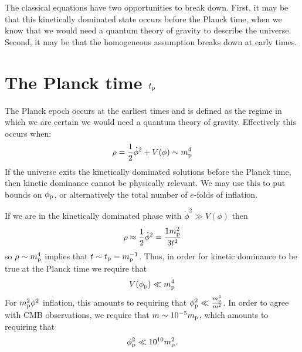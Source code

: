 The classical equations have two opportunities to break down. First, it may be that this kinetically dominated state occurs before the Planck time, when we know that we would need a quantum theory of gravity to describe the universe. Second, it may be that the homogeneous assumption breaks down at early times.

\section{The Planck time $t_{\mathrm{p}}$}
The Planck epoch occurs at the earliest times and is defined as the
regime in which we are certain we would need a quantum theory of
gravity. Effectively this occurs when:
\begin{equation}
  \rho = \frac{1}{2}\dot\phi^2 + V(\phi)  \sim m_{\mathrm{p}}^4
  \label{eqn:rhosim}
\end{equation}
If the universe exits the kinetically dominated solutions before the
Planck time, then kinetic dominance cannot be physically relevant. We
may use this to put bounds on $\phi_{\mathrm{p}}$, or alternatively the total
number of $e$-folds of inflation.

If we are in the kinetically dominated phase with $\dot{\phi}^2\gg
V(\phi)$ then
\begin{equation}
              \rho \approx \frac{1}{2}\dot\phi^2= \frac{1m_{\mathrm{p}}^2}{3t^2} 
  \label{eqn:rhop}
\end{equation}
so $\rho\sim m_{\mathrm{p}}^4$ implies that $t\sim t_{\mathrm{p}}=m_{\mathrm{p}}^{-1}$. Thus, in order for
kinetic dominance to be true at the Planck time we require that
\begin{equation}
  V(\phi_{\mathrm{p}}) \ll m_{\mathrm{p}}^4
\end{equation}
For $m_{\mathrm{p}}^2\phi^2$ inflation, this amounts to requiring that $\phi_{\mathrm{p}}^2\ll
\frac{m_{\mathrm{p}}^4}{m^2}$. In order to agree with CMB observations, we require
that $m\sim10^{-5}m_{\mathrm{p}}$, which amounts to requiring that 
\begin{equation}
 \phi_{\mathrm{p}}^2 \ll 10^{10}m_{\mathrm{p}}^2 \nonumber.
 \label{eqn:phipbound}
\end{equation}

